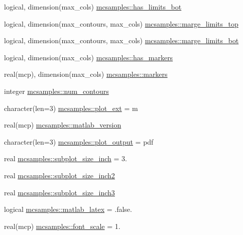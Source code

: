 \begin{DoxyCompactItemize}
\item 
logical, dimension(max\+\_\+cols) \mbox{\hyperlink{namespacemcsamples_af020921aecf16dd5008460d6a82fdd64}{mcsamples\+::has\+\_\+limits\+\_\+bot}}
\item 
logical, dimension(max\+\_\+contours, max\+\_\+cols) \mbox{\hyperlink{namespacemcsamples_a22f55004d2d1debc557bf626e9b2af89}{mcsamples\+::marge\+\_\+limits\+\_\+top}}
\item 
logical, dimension(max\+\_\+contours, max\+\_\+cols) \mbox{\hyperlink{namespacemcsamples_a6c36f035fe1ec1e688afcc0ac112e425}{mcsamples\+::marge\+\_\+limits\+\_\+bot}}
\item 
logical, dimension(max\+\_\+cols) \mbox{\hyperlink{namespacemcsamples_a0233de8ae126379ac2ebc11c0981db61}{mcsamples\+::has\+\_\+markers}}
\item 
real(mcp), dimension(max\+\_\+cols) \mbox{\hyperlink{namespacemcsamples_ad7bc69baf30e862c773070e99974d483}{mcsamples\+::markers}}
\item 
integer \mbox{\hyperlink{namespacemcsamples_adb5eb76b1f11b911bf9e72be639d5226}{mcsamples\+::num\+\_\+contours}}
\item 
character(len=3) \mbox{\hyperlink{namespacemcsamples_ad18bd8eb2345c17a7aad3604eba3e3ad}{mcsamples\+::plot\+\_\+ext}} = \textquotesingle{}m\textquotesingle{}
\item 
real(mcp) \mbox{\hyperlink{namespacemcsamples_a24dc02cd209419956007efc05c309274}{mcsamples\+::matlab\+\_\+version}}
\item 
character(len=3) \mbox{\hyperlink{namespacemcsamples_a4aac456ce5052be90e290891a61466f1}{mcsamples\+::plot\+\_\+output}} = \textquotesingle{}pdf\textquotesingle{}
\item 
real \mbox{\hyperlink{namespacemcsamples_a5c59bb75d9bde473650c9d04a44e6010}{mcsamples\+::subplot\+\_\+size\+\_\+inch}} = 3.
\item 
real \mbox{\hyperlink{namespacemcsamples_a6dd34bac13f09636652e328d92707726}{mcsamples\+::subplot\+\_\+size\+\_\+inch2}}
\item 
real \mbox{\hyperlink{namespacemcsamples_ab97f8de1d5924a4908cb5b7953a30f16}{mcsamples\+::subplot\+\_\+size\+\_\+inch3}}
\item 
logical \mbox{\hyperlink{namespacemcsamples_acd85fa3b4250ca366e08576bd4df6bd8}{mcsamples\+::matlab\+\_\+latex}} = .false.
\item 
real(mcp) \mbox{\hyperlink{namespacemcsamples_ae4e5ef0996e111c2f91121884b99ccdc}{mcsamples\+::font\+\_\+scale}} = 1.
\item 

\end{DoxyCompactItemize}
